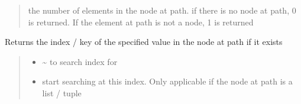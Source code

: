 \documentclass[a4paper,10pt,english]{sphinxmanual}
\begin{document}
\begin{fulllineitems}
\begin{fulllineitems}
\begin{quote}
\begin{description}
\begin{itemize}
\end{itemize}

\sphinxAtStartPar
the number of elements in the node at path. if there is no node at path, 0 is returned. If the element
at path is not a node, 1 is returned

\end{description}\end{quote}

\end{fulllineitems}


\begin{fulllineitems}
\label{\detokenize{fagus:fagus.Fagus.index}}
\pysigstartsignatures
{}
\pysigstopsignatures
\sphinxAtStartPar
Returns the index / key of the specified value in the node at path if it exists
\begin{quote}\begin{description}
\begin{itemize}
\item {}
\sphinxAtStartPar
{} \textendash{} \textasciitilde{} to search index for

\item {}
\sphinxAtStartPar
{} \textendash{} start searching at this index. Only applicable if the node at path is a list / tuple


\end{itemize}
\end{description}
\end{quote}
\end{fulllineitems}
\end{fulllineitems}
\end{document}

